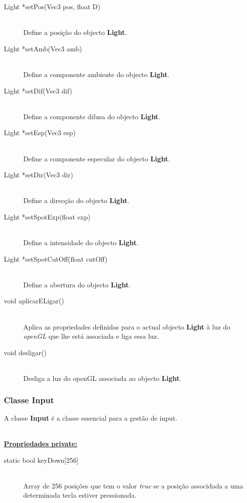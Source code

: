 \documentclass[a5paper,onecolumn, 11pt]{article}
\begin{document}
\begin{description}
	\item[Light *setPos(Vec3 pos, float D)] \hfill \\
	Define a posição do objecto \textbf{Light}.

	\item[Light *setAmb(Vec3 amb)] \hfill \\
	Define a componente ambiente do objecto \textbf{Light}.

	\item[Light *setDif(Vec3 dif)] \hfill \\
	Define a componente difusa do objecto \textbf{Light}.

	\item[Light *setEsp(Vec3 esp)] \hfill \\
	Define a componente especular do objecto \textbf{Light}.

	\item[Light *setDir(Vec3 dir)] \hfill \\
	Define a direcção do objecto \textbf{Light}.

	\item[Light *setSpotExp(float exp)] \hfill \\
	Define a intensidade do objecto \textbf{Light}.

	\item[Light *setSpotCutOff(float cutOff)] \hfill \\
	Define a abertura do objecto \textbf{Light}.

	\item[void aplicarELigar()] \hfill \\
	Aplica as propriedades definidas para o actual objecto \textbf{Light} à luz do \textit{openGL} que lhe está associada e liga essa luz.

	\item[void desligar()] \hfill \\
	Desliga a luz do openGL associada ao objecto \textbf{Light}.
\end{description}

\clearpage
\subsubsection{Classe Input} \label{classe input}
A classe \textbf{Input} é a classe essencial para a gestão de input.

\hfill \\ \underline{\textbf{Propriedades private:}}

\begin{description}
	\item[static bool keyDown{[256]}] \hfill \\
	Array de 256 posições que tem o valor \textit{true} se a posição associdada a uma determinada tecla estiver pressionada.
\end{description}
\end{document}
